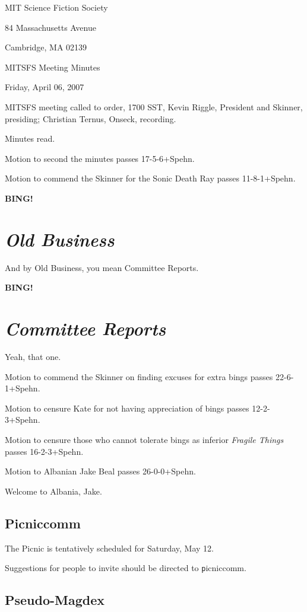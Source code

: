 \documentclass[10pt]{article}
\newcommand{\bing}{{\bf BING!} }
\newcommand{\goto}[1]{\bing \vskip 12pt \section*{{\em{#1}}}}
\begin{document}
\begin{center}

MIT Science Fiction Society

84 Massachusetts Avenue

Cambridge, MA 02139

\vspace{12pt}

MITSFS Meeting Minutes

Friday, April 06, 2007

\end{center}

\vspace{18pt}

\setlength{\parskip}{6pt}

\noindent
MITSFS meeting called to order, 1700 SST,
Kevin Riggle, President and Skinner, presiding; Christian Ternus, Onseck, recording.

Minutes read.

Motion to second the minutes passes 17-5-6+Spehn.

Motion to commend the Skinner for the Sonic Death Ray passes 11-8-1+Spehn.

\goto{Old Business}

And by Old Business, you mean Committee Reports.

\goto{Committee Reports}

Yeah, that one. 

Motion to commend the Skinner on finding excuses for extra bings passes 22-6-1+Spehn.

Motion to censure Kate for not having appreciation of bings passes 12-2-3+Spehn.

Motion to censure those who cannot tolerate bings as inferior \emph{Fragile Things} passes 16-2-3+Spehn.

Motion to Albanian Jake Beal passes 26-0-0+Spehn.

Welcome to Albania, Jake.

\subsection*{Picniccomm}

The Picnic is tentatively scheduled for Saturday, May 12.

Suggestions for people to invite should be directed to {\texttt picniccomm}.

\subsection*{Pseudo-Magdex}
\end{document}
